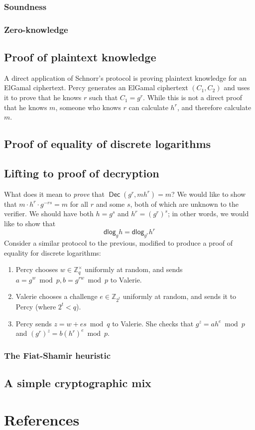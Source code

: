 \documentclass[11pt,twoside,a4paper]{article}
\DeclareMathOperator{\Dec}{\mathsf{Dec}}
\newcommand{\dlog}{\mathsf{dlog}}
\theoremstyle{definition}
\begin{document}
\subsubsection{Soundness}
\subsubsection{Zero-knowledge}
\subsection{Proof of plaintext knowledge}
A direct application of Schnorr's protocol is proving plaintext knowledge for an ElGamal ciphertext. Percy generates an ElGamal ciphertext \((C_1, C_2)\) and uses it to prove that he knows \(r\) such that \(C_1=g^r\). While this is not a direct proof that he knows \(m\), someone who knows \(r\) can calculate \(h^r\), and therefore calculate \(m\).

\subsection{Proof of equality of discrete logarithms}


\subsection{Lifting to proof of decryption}
What does it mean to \textit{prove} that \(\Dec(g^r,mh^r)=m\)? We would like to show that \(m\cdot h^r\cdot g^{-rs}=m\) for all \(r\) and some \(s\), both of which are unknown to the verifier. We should have both \(h=g^s\) and \(h^r=(g^r)^s\); in other words, we would like to show that
\[\dlog_g{h}=\dlog_{g^r}{h^r}\]
Consider a similar protocol to the previous, modified to produce a proof of equality for discrete logarithms:
\begin{enumerate}
    \item Percy chooses \(w\in\mathbb{Z}^\times_q\) uniformly at random, and sends \(a=g^w\bmod p,b=g^{rw}\bmod p\) to Valerie.
    \item Valerie chooses a challenge \(e\in\mathbb{Z}_{2^t}\) uniformly at random, and sends it to Percy (where \(2^t<q\)).
    \item Percy sends \(z=w+es\bmod q\) to Valerie. She checks that \(g^z=ah^e\bmod p\) and \((g^r)^z=b(h^r)^e\bmod p\).
\end{enumerate}
\subsubsection{The Fiat-Shamir heuristic}
\subsection{A simple cryptographic mix}
\vfill\pagebreak
\section{References}


\end{document}
